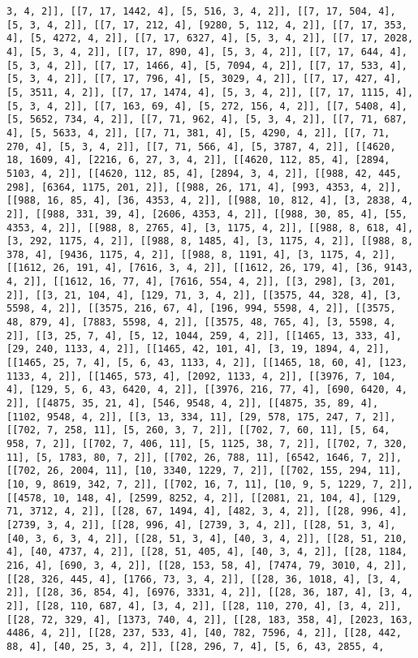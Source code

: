 \documentclass[12pt,fleqn]{article}\usepackage{../../common}
\begin{document}
\begin{verbatim}
3, 4, 2]], [[7, 17, 1442, 4], [5, 516, 3, 4, 2]], [[7, 17, 504, 4], [5, 3, 4, 2]], [[7, 17, 212, 4], [9280, 5, 112, 4, 2]], [[7, 17, 353, 4], [5, 4272, 4, 2]], [[7, 17, 6327, 4], [5, 3, 4, 2]], [[7, 17, 2028, 4], [5, 3, 4, 2]], [[7, 17, 890, 4], [5, 3, 4, 2]], [[7, 17, 644, 4], [5, 3, 4, 2]], [[7, 17, 1466, 4], [5, 7094, 4, 2]], [[7, 17, 533, 4], [5, 3, 4, 2]], [[7, 17, 796, 4], [5, 3029, 4, 2]], [[7, 17, 427, 4], [5, 3511, 4, 2]], [[7, 17, 1474, 4], [5, 3, 4, 2]], [[7, 17, 1115, 4], [5, 3, 4, 2]], [[7, 163, 69, 4], [5, 272, 156, 4, 2]], [[7, 5408, 4], [5, 5652, 734, 4, 2]], [[7, 71, 962, 4], [5, 3, 4, 2]], [[7, 71, 687, 4], [5, 5633, 4, 2]], [[7, 71, 381, 4], [5, 4290, 4, 2]], [[7, 71, 270, 4], [5, 3, 4, 2]], [[7, 71, 566, 4], [5, 3787, 4, 2]], [[4620, 18, 1609, 4], [2216, 6, 27, 3, 4, 2]], [[4620, 112, 85, 4], [2894, 5103, 4, 2]], [[4620, 112, 85, 4], [2894, 3, 4, 2]], [[988, 42, 445, 298], [6364, 1175, 201, 2]], [[988, 26, 171, 4], [993, 4353, 4, 2]], [[988, 16, 85, 4], [36, 4353, 4, 2]], [[988, 10, 812, 4], [3, 2838, 4, 2]], [[988, 331, 39, 4], [2606, 4353, 4, 2]], [[988, 30, 85, 4], [55, 4353, 4, 2]], [[988, 8, 2765, 4], [3, 1175, 4, 2]], [[988, 8, 618, 4], [3, 292, 1175, 4, 2]], [[988, 8, 1485, 4], [3, 1175, 4, 2]], [[988, 8, 378, 4], [9436, 1175, 4, 2]], [[988, 8, 1191, 4], [3, 1175, 4, 2]], [[1612, 26, 191, 4], [7616, 3, 4, 2]], [[1612, 26, 179, 4], [36, 9143, 4, 2]], [[1612, 16, 77, 4], [7616, 554, 4, 2]], [[3, 298], [3, 201, 2]], [[3, 21, 104, 4], [129, 71, 3, 4, 2]], [[3575, 44, 328, 4], [3, 5598, 4, 2]], [[3575, 216, 67, 4], [196, 994, 5598, 4, 2]], [[3575, 48, 879, 4], [7883, 5598, 4, 2]], [[3575, 48, 765, 4], [3, 5598, 4, 2]], [[3, 25, 7, 4], [5, 12, 1044, 259, 4, 2]], [[1465, 13, 333, 4], [29, 240, 1133, 4, 2]], [[1465, 42, 101, 4], [3, 19, 1894, 4, 2]], [[1465, 25, 7, 4], [5, 6, 43, 1133, 4, 2]], [[1465, 18, 60, 4], [123, 1133, 4, 2]], [[1465, 573, 4], [2092, 1133, 4, 2]], [[3976, 7, 104, 4], [129, 5, 6, 43, 6420, 4, 2]], [[3976, 216, 77, 4], [690, 6420, 4, 2]], [[4875, 35, 21, 4], [546, 9548, 4, 2]], [[4875, 35, 89, 4], [1102, 9548, 4, 2]], [[3, 13, 334, 11], [29, 578, 175, 247, 7, 2]], [[702, 7, 258, 11], [5, 260, 3, 7, 2]], [[702, 7, 60, 11], [5, 64, 958, 7, 2]], [[702, 7, 406, 11], [5, 1125, 38, 7, 2]], [[702, 7, 320, 11], [5, 1783, 80, 7, 2]], [[702, 26, 788, 11], [6542, 1646, 7, 2]], [[702, 26, 2004, 11], [10, 3340, 1229, 7, 2]], [[702, 155, 294, 11], [10, 9, 8619, 342, 7, 2]], [[702, 16, 7, 11], [10, 9, 5, 1229, 7, 2]], [[4578, 10, 148, 4], [2599, 8252, 4, 2]], [[2081, 21, 104, 4], [129, 71, 3712, 4, 2]], [[28, 67, 1494, 4], [482, 3, 4, 2]], [[28, 996, 4], [2739, 3, 4, 2]], [[28, 996, 4], [2739, 3, 4, 2]], [[28, 51, 3, 4], [40, 3, 6, 3, 4, 2]], [[28, 51, 3, 4], [40, 3, 4, 2]], [[28, 51, 210, 4], [40, 4737, 4, 2]], [[28, 51, 405, 4], [40, 3, 4, 2]], [[28, 1184, 216, 4], [690, 3, 4, 2]], [[28, 153, 58, 4], [7474, 79, 3010, 4, 2]], [[28, 326, 445, 4], [1766, 73, 3, 4, 2]], [[28, 36, 1018, 4], [3, 4, 2]], [[28, 36, 854, 4], [6976, 3331, 4, 2]], [[28, 36, 187, 4], [3, 4, 2]], [[28, 110, 687, 4], [3, 4, 2]], [[28, 110, 270, 4], [3, 4, 2]], [[28, 72, 329, 4], [1373, 740, 4, 2]], [[28, 183, 358, 4], [2023, 163, 4486, 4, 2]], [[28, 237, 533, 4], [40, 782, 7596, 4, 2]], [[28, 442, 88, 4], [40, 25, 3, 4, 2]], [[28, 296, 7, 4], [5, 6, 43, 2855, 4, 
\end{verbatim}
\end{document}
